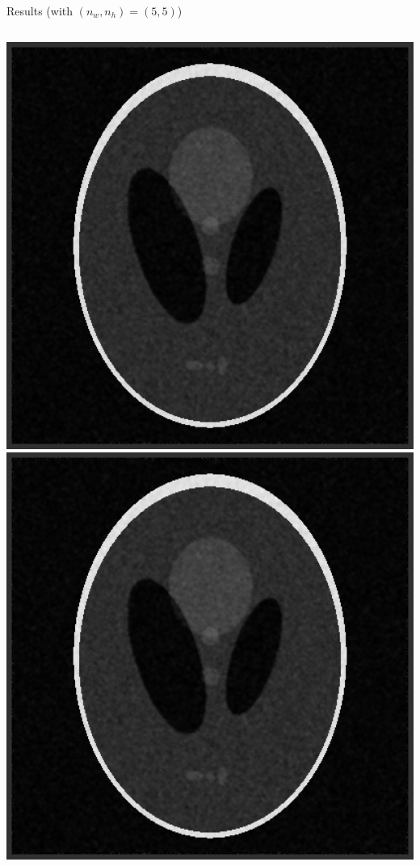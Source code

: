 \begin{frame}{Results (with $(n_w, n_h) = (5, 5)$)}
\centering
\begin{columns}
\centering
\includegraphics[scale=0.25]{images/results/nlm/image_mae.png}
\centering
\includegraphics[scale=0.25]{images/results/nlm/image_mse.png}
\end{columns}
\end{frame}